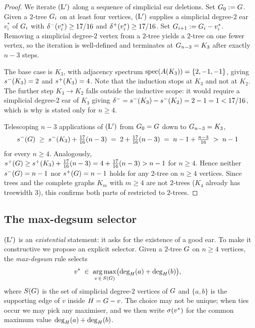 \begin{proof}
We iterate $(\mathrm{L}')$ along a sequence of simplicial ear deletions.
Set $G_{0} := G$. Given a $2$-tree $G_{i}$ on at least
four vertices, $(\mathrm{L}')$ supplies a simplicial degree-$2$ ear
$v_{i}^{*}$ of $G_{i}$ with $\delta^{-}(v_{i}^{*}) \ge 17/16$ and
$\delta^{+}(v_{i}^{*}) \ge 17/16$. Set
$G_{i+1} := G_{i} - v_{i}^{*}$. Removing a simplicial degree-$2$
vertex from a $2$-tree yields a $2$-tree on one fewer vertex, so the
iteration is well-defined and terminates at $G_{n-3} = K_{3}$
after exactly $n - 3$ steps.

The base case is $K_{3}$, with adjacency spectrum
$\operatorname{spec}(A(K_{3})) = \{2, -1, -1\}$, giving $s^{-}(K_{3}) = 2$ and
$s^{+}(K_{3}) = 4$. Note that the induction stops at $K_{3}$ and not at $K_{2}$. The
further step $K_{3} \to K_{2}$ falls outside the inductive scope: it
would require a simplicial degree-$2$ ear of $K_{3}$ giving
$\delta^{-} = s^{-}(K_{3}) - s^{-}(K_{2}) = 2 - 1 = 1 < 17/16$, which
is why  is stated only for $n \ge 4$.

Telescoping $n - 3$ applications of $(\mathrm{L}')$ from $G_{0} = G$
down to $G_{n-3} = K_{3}$,
\[
s^{-}(G) \;\ge\; s^{-}(K_{3}) + \tfrac{17}{16}(n - 3)
\;=\; 2 + \tfrac{17}{16}(n - 3)
\;=\; n - 1 + \tfrac{n - 3}{16}
\;>\; n - 1
\]
for every $n \ge 4$. Analogously,
$s^{+}(G) \ge s^{+}(K_{3}) + \tfrac{17}{16}(n - 3) = 4 + \tfrac{17}{16}(n - 3) > n - 1$
for $n \ge 4$. Hence neither $s^{-}(G) = n - 1$ nor
$s^{+}(G) = n - 1$ holds for any $2$-tree on $n \ge 4$ vertices.
Since trees and the complete graphs $K_{m}$ with $m \ge 4$ are not
$2$-trees ($K_{4}$ already has treewidth $3$), this confirms both
parts of  restricted to $2$-trees.
\end{proof}

\subsection{The max-degsum selector}\label{sec:lprime:max-degsum}

$(\mathrm{L}')$ is an \emph{existential} statement: it asks for the existence
of a good ear. To make it constructive we propose an explicit selector.
Given a $2$-tree $G$ on $n \ge 4$ vertices, the
\emph{max-degsum} rule selects
\[
v^{*} \;\in\; \operatorname*{arg\,max}_{v \,\in\, S(G)}
\bigl(\deg_{H}(a) + \deg_{H}(b)\bigr),
\]
where $S(G)$ is the set of simplicial degree-$2$ vertices of
$G$ and $\{a, b\}$ is the supporting edge of $v$ inside
$H = G - v$. The choice may not be unique; when ties occur
we may pick any maximiser, and we then write $\sigma(v^{*})$ for
the common maximum value $\deg_{H}(a) + \deg_{H}(b)$.

